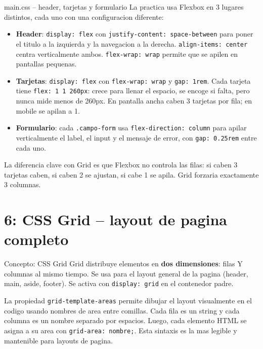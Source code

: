 \documentclass[11pt,a4paper]{article}
\begin{document}
	\begin{cajapractica}{main.css -- header, tarjetas y formulario}
		La practica usa Flexbox en 3 lugares distintos, cada uno con una configuracion diferente:
		
		\begin{itemize}[leftmargin=1.2em,itemsep=3pt]
			\item \textbf{Header}: \texttt{display: flex} con \texttt{justify-content: space-between} para poner el titulo a la izquierda y la navegacion a la derecha. \texttt{align-items: center} centra verticalmente ambos. \texttt{flex-wrap: wrap} permite que se apilen en pantallas pequenas.
			\item \textbf{Tarjetas}: \texttt{display: flex} con \texttt{flex-wrap: wrap} y \texttt{gap: 1rem}. Cada tarjeta tiene \texttt{flex: 1 1 260px}: crece para llenar el espacio, se encoge si falta, pero nunca mide menos de 260px. En pantalla ancha caben 3 tarjetas por fila; en mobile se apilan a 1.
			\item \textbf{Formulario}: cada \texttt{.campo-form} usa \texttt{flex-direction: column} para apilar verticalmente el label, el input y el mensaje de error, con \texttt{gap: 0.25rem} entre cada uno.
		\end{itemize}
		
		La diferencia clave con Grid es que Flexbox no controla las filas: si caben 3 tarjetas caben, si caben 2 se ajustan, si cabe 1 se apila. Grid forzaria exactamente 3 columnas.
	\end{cajapractica}
	
	\section{6: CSS Grid -- layout de pagina completo}
	
	\begin{cajaconcepto}{Concepto: CSS Grid}
		Grid distribuye elementos en \textbf{dos dimensiones}: filas Y columnas al mismo tiempo. Se usa para el layout general de la pagina (header, main, aside, footer). Se activa con \texttt{display: grid} en el contenedor padre.
		
		La propiedad \texttt{grid-template-areas} permite dibujar el layout visualmente en el codigo usando nombres de area entre comillas. Cada fila es un string y cada columna es un nombre separado por espacios. Luego, cada elemento HTML se asigna a su area con \texttt{grid-area: nombre;}. Esta sintaxis es la mas legible y mantenible para layouts de pagina.
	\end{cajaconcepto}
	
\end{document}
